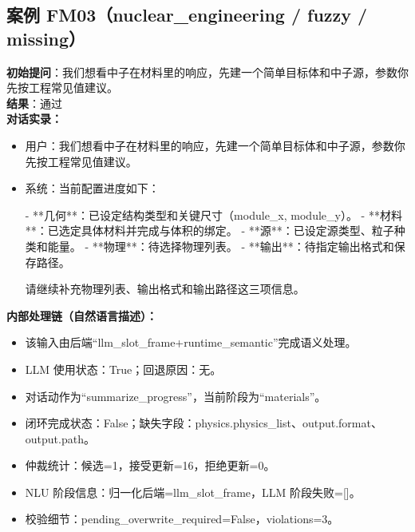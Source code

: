 \documentclass[11pt]{ctexart}
\begin{document}
\subsection{案例 FM03（nuclear\_engineering / fuzzy / missing）}
\textbf{初始提问}：我们想看中子在材料里的响应，先建一个简单目标体和中子源，参数你先按工程常见值建议。\\
\textbf{结果}：通过\\
\textbf{对话实录：}
\begin{itemize}
\item 用户：我们想看中子在材料里的响应，先建一个简单目标体和中子源，参数你先按工程常见值建议。
\item 系统：当前配置进度如下：

- **几何**：已设定结构类型和关键尺寸（module\_x, module\_y）。
- **材料**：已选定具体材料并完成与体积的绑定。
- **源**：已设定源类型、粒子种类和能量。
- **物理**：待选择物理列表。
- **输出**：待指定输出格式和保存路径。

请继续补充物理列表、输出格式和输出路径这三项信息。
\end{itemize}
\textbf{内部处理链（自然语言描述）：}
\begin{itemize}
\item 该输入由后端“llm\_slot\_frame+runtime\_semantic”完成语义处理。
\item LLM 使用状态：True；回退原因：无。
\item 对话动作为“summarize\_progress”，当前阶段为“materials”。
\item 闭环完成状态：False；缺失字段：physics.physics\_list、output.format、output.path。
\item 仲裁统计：候选=1，接受更新=16，拒绝更新=0。
\item NLU 阶段信息：归一化后端=llm\_slot\_frame，LLM 阶段失败=[]。
\item 校验细节：pending\_overwrite\_required=False，violations=3。
\end{itemize}
\end{document}
